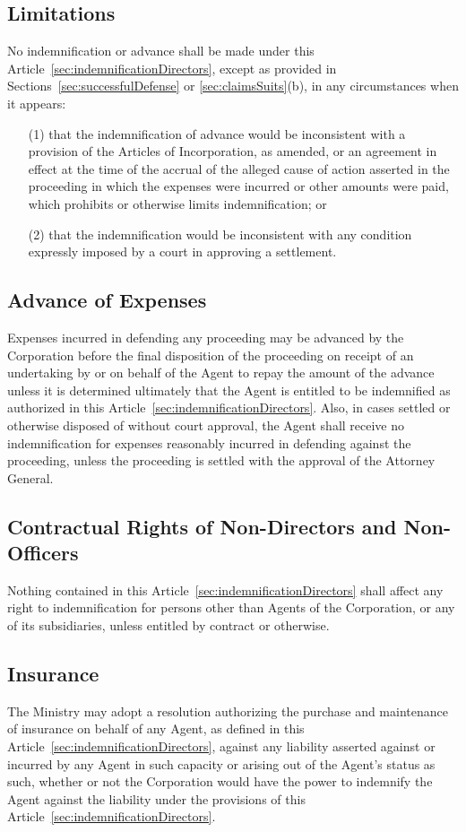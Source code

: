 \documentclass[letterpaper,titlepage]{article}
\begin{document}
\subsection{Limitations}
\label{sec:limitations2}
No indemnification or advance shall be made under this
Article~\ref{sec:indemnificationDirectors}, except as provided in
Sections~\ref{sec:successfulDefense} or \ref{sec:claimsSuits}(b), in any
circumstances when it appears:
\begin{itemize}
    \item[(1)] that the indemnification of advance would be inconsistent with a
        provision of the Articles of Incorporation, as amended, or an agreement
        in effect at the time of the accrual of the alleged cause of action
        asserted in the proceeding in which the expenses were incurred or other
        amounts were paid, which prohibits or otherwise limits indemnification;
        or
    \item[(2)] that the indemnification would be inconsistent with any condition
        expressly imposed by a court in approving a settlement.
\end{itemize}
\subsection{Advance of Expenses}
\label{sec:advanceExpenses}
Expenses incurred in defending any proceeding may be advanced by the
Corporation before the final disposition of the proceeding on receipt of an
undertaking by or on behalf of the Agent to repay the amount of the advance
unless it is determined ultimately that the Agent is entitled to be indemnified
as authorized in this Article~\ref{sec:indemnificationDirectors}. Also, in
cases settled or otherwise disposed of without court approval, the Agent shall
receive no indemnification for expenses reasonably incurred in defending
against the proceeding, unless the proceeding is settled with the approval of
the Attorney General.
\subsection{Contractual Rights of Non-Directors and Non-Officers}
\label{sec:contractualRights}
Nothing contained in this Article~\ref{sec:indemnificationDirectors} shall
affect any right to indemnification for persons other than Agents of the
Corporation, or any of its subsidiaries, unless entitled by contract or
otherwise.
\subsection{Insurance}
\label{sec:insurance}
The Ministry may adopt a resolution authorizing the purchase and maintenance of
insurance on behalf of any Agent, as defined in this
Article~\ref{sec:indemnificationDirectors}, against any liability asserted
against or incurred by any Agent in such capacity or arising out of the Agent's
status as such, whether or not the Corporation would have the power to
indemnify the Agent against the liability under the provisions of this
Article~\ref{sec:indemnificationDirectors}.
\end{document}
